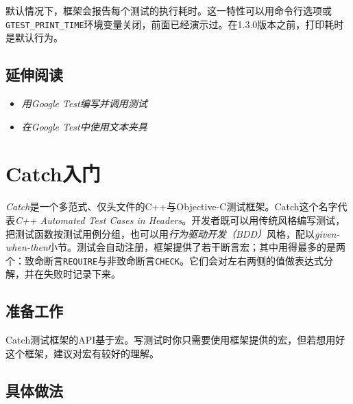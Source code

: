 
默认情况下，框架会报告每个测试的执行耗时。这一特性可以用命令行选项或\texttt{GTEST\_\allowbreak{}PRINT\_\allowbreak{}TIME}环境变量关闭，前面已经演示过。在1.3.0版本之前，打印耗时是默认行为。



\subsection{延伸阅读}



\begin{itemize}
\item \textit{用Google Test编写并调用测试}



\item \textit{在Google Test中使用文本夹具}

\end{itemize}



\section{Catch入门}



\textit{Catch}是一个多范式、仅头文件的C++与Objective-C测试框架。Catch这个名字代表\textit{C++ Automated Test Cases in Headers}。开发者既可以用传统风格编写测试，把测试函数按测试用例分组，也可以用\textit{行为驱动}\textit{开发（BDD）}风格，配以\textit{given-when-then}小节。测试会自动注册，框架提供了若干断言宏；其中用得最多的是两个：致命断言\texttt{REQUIRE}与非致命断言\texttt{CHECK}。它们会对左右两侧的值做表达式分解，并在失败时记录下来。



\subsection{准备工作}



Catch测试框架的API基于宏。写测试时你只需要使用框架提供的宏，但若想用好这个框架，建议对宏有较好的理解。



\subsection{具体做法}


